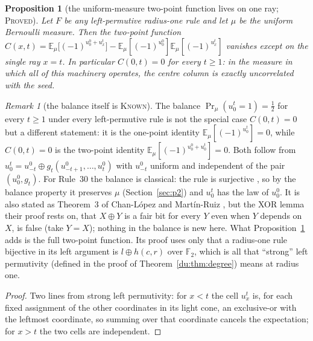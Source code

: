 \documentclass[11pt]{article}
\newtheorem{proposition}[theorem]{Proposition}
\theoremstyle{definition}
\theoremstyle{remark}
\newtheorem{remark}[theorem]{Remark}
\newcommand{\F}{\mathbb{F}_2}
\newcommand{\PROVED}{\textsc{Proved}}
\newcommand{\KNOWN}{\textsc{Known}}
\begin{document}
\begin{proposition}[the uniform-measure two-point function lives on one ray; \PROVED]\label{du:tworay}
Let $F$ be any left-permutive radius-one rule and let $\mu$ be the uniform Bernoulli measure. Then the
two-point function $C(x,t)=\mathbb E_\mu\bigl[(-1)^{u^0_0+u^t_x}\bigr]-\mathbb E_\mu[(-1)^{u^0_0}]
\mathbb E_\mu[(-1)^{u^t_x}]$ vanishes except on the single ray $x=t$. In particular $C(0,t)=0$ for every
$t\ge1$: in the measure in which all of this machinery operates, the centre column is exactly
uncorrelated with the seed.
\end{proposition}
\begin{remark}[the balance itself is \KNOWN]\label{du:rem:balance}
The balance $\Pr_\mu(u^t_0=1)=\tfrac12$ for every $t\ge1$ under every left-permutive rule is not the special case $C(0,t)=0$ but a different statement: it is the one-point identity $\mathbb E_\mu[(-1)^{u^t_0}]=0$, while $C(0,t)=0$ is the two-point identity $\mathbb E_\mu[(-1)^{u^0_0+u^t_0}]=0$. Both follow from $u^t_0=u^0_{-t}\oplus g_t(u^0_{-t+1},\dots,u^0_t)$ with $u^0_{-t}$ uniform and independent of the pair $(u^0_0,g_t)$. For Rule~$30$ the balance is classical: the rule is surjective \cite[Thm.~6.6]{Hedlund}, so by the balance property \cite[Thm.~5.4]{Hedlund} it preserves $\mu$ (Section~\ref{sec:p2}) and $u^t_0$ has the law of $u^0_0$. It is also stated as Theorem~3 of Chan-L\'opez and Mart\'in-Ruiz \cite{CLMR}, but the XOR lemma their proof rests on, that $X\oplus Y$ is a fair bit for every $Y$ even when $Y$ depends on $X$, is false (take $Y=X$); nothing in the balance is new here. What Proposition~\ref{du:tworay} adds is the full two-point function. Its proof uses only that a radius-one rule bijective in its left argument is $l\oplus h(c,r)$ over $\F$, which is all that ``strong'' left permutivity (defined in the proof of Theorem~\ref{du:thm:degree}) means at radius one.
\end{remark}
\begin{proof}
Two lines from strong left permutivity: for $x<t$ the cell $u^t_x$ is, for each fixed assignment of the
other coordinates in its light cone, an exclusive-or with the leftmost coordinate, so summing over that
coordinate cancels the expectation; for $x>t$ the two cells are independent.
\end{proof}
\end{document}
